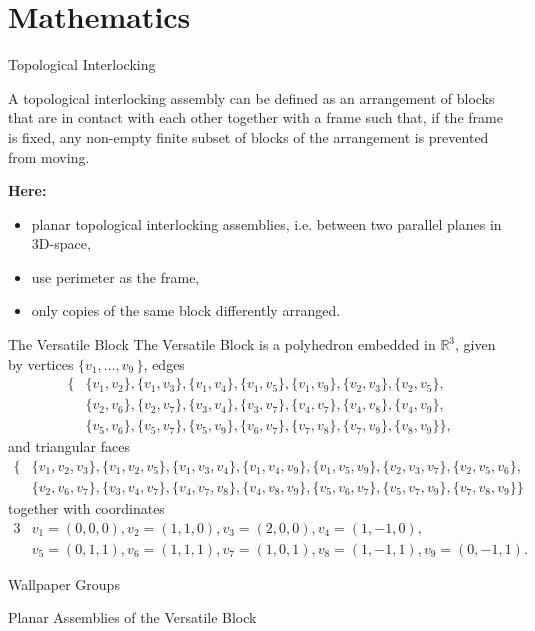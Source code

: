 \documentclass{beamer}
\numberwithin{equation}{aufgabe}
\newcommand\R{\mathbb R}
\begin{document}
\section{Mathematics}
\begin{frame}{Topological Interlocking}
    \begin{definition}
        A topological interlocking assembly can be defined as an arrangement of blocks that are in contact with each other together with a frame such that, if the frame is fixed, any non-empty finite subset of blocks of the arrangement is prevented from moving.
    \end{definition}
    \pause
    \textbf{Here:} 
    \begin{itemize}
        \item planar topological interlocking assemblies, i.e. between two parallel planes in 3D-space,
        \pause\item use perimeter as the frame,
        \pause\item only copies of the same block differently arranged.
    \end{itemize}  
\end{frame}
\begin{frame}{The Versatile Block}
    The Versatile Block is a polyhedron embedded in $\R^3$, given by vertices $\{v_1,\ldots,v_9 \, \}$, edges
    \begin{align*}
        \{  &\{ v_1, v_2 \},  \{ v_1, v_3 \},  \{ v_1, v_4 \}, \{ v_1, v_5 \}, \{ v_1, v_9 \},  \{ v_2, v_3 \}, \{ v_2, v_5 \}, \\
        & \{ v_2, v_6 \},  \{ v_2, v_7 \},  \{ v_3, v_4 \},  \{ v_3, v_7 \},  \{ v_4, v_7 \}, \{ v_4, v_8 \}, \{ v_4, v_9 \},\\
        & \{ v_5, v_6 \}, \{ v_5, v_7 \},  \{ v_5, v_9 \}, \{ v_6, v_7 \},  \{ v_7, v_8 \},  \{ v_7, v_9 \},  \{ v_8, v_9 \}  \},
    \end{align*} 
    and triangular faces
    \begin{align*}
        \{& \{v_1, v_2, v_3\}, \{v_1, v_2, v_5\},  \{v_1, v_3, v_4\}, \{v_1, v_4, v_9\}, \{v_1, v_5, v_9\}, \{v_2, v_3, v_7\},  \{v_2, v_5, v_6\},\\
        &\{v_2, v_6, v_7\},  \{v_3, v_4, v_7\},  \{v_4, v_7, v_8\},  \{v_4, v_8, v_9\},  \{v_5, v_6, v_7\},  \{v_5, v_7, v_9\}, \{v_7, v_8, v_9\}\}
    \end{align*}
    together with coordinates
    \begin{alignat*}{3}
    &v_1 = (0, 0, 0) , v_2 = (1, 1, 0) ,  v_3 = (2, 0, 0) , v_4 = (1, -1, 0) , \\
    &v_5 = (0, 1, 1) ,  v_6 = (1, 1, 1) ,  v_7 = (1, 0, 1) , v_8 = (1, -1, 1) , v_9 = (0, -1, 1).
    \end{alignat*} 
\end{frame}
\begin{frame}{Wallpaper Groups}

\end{frame}
\begin{frame}{Planar Assemblies of the Versatile Block}

\end{frame}
\end{document}
